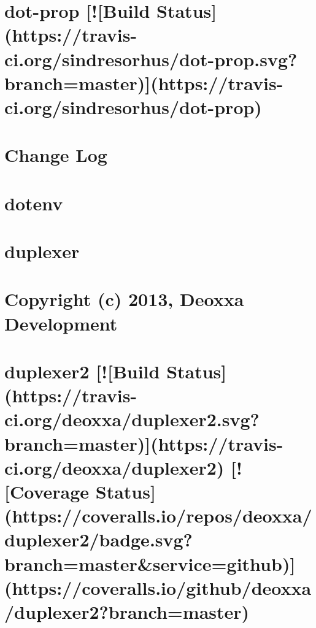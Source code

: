 \documentclass[twoside]{book}
\newcommand{\+}{\discretionary{\mbox{\scriptsize$\hookleftarrow$}}{}{}}
\begin{document}
\chapter{dot-\/prop \mbox{[}!\mbox{[}Build Status\mbox{]}(https\+://travis-\/ci.org/sindresorhus/dot-\/prop.svg?branch=master)\mbox{]}(https\+://travis-\/ci.org/sindresorhus/dot-\/prop)}
\label{md__c_1_workspace_demo_src_main_script_node_modules_dot-prop_readme}

\chapter{Change Log}
\label{md__c_1_workspace_demo_src_main_script_node_modules_dotenv__c_h_a_n_g_e_l_o_g}

\chapter{dotenv}
\label{md__c_1_workspace_demo_src_main_script_node_modules_dotenv__r_e_a_d_m_e}

\chapter{duplexer}
\label{md__c_1_workspace_demo_src_main_script_node_modules_duplexer__r_e_a_d_m_e}

\chapter{Copyright (c) 2013, Deoxxa Development}
\label{md__c_1_workspace_demo_src_main_script_node_modules_duplexer2__l_i_c_e_n_s_e}

\chapter{duplexer2 \mbox{[}!\mbox{[}Build Status\mbox{]}(https\+://travis-\/ci.org/deoxxa/duplexer2.svg?branch=master)\mbox{]}(https\+://travis-\/ci.org/deoxxa/duplexer2) \mbox{[}!\mbox{[}Coverage Status\mbox{]}(https\+://coveralls.io/repos/deoxxa/duplexer2/badge.svg?branch=master\&service=github)\mbox{]}(https\+://coveralls.io/github/deoxxa/duplexer2?branch=master)}
\label{md__c_1_workspace_demo_src_main_script_node_modules_duplexer2__r_e_a_d_m_e}

\end{document}
